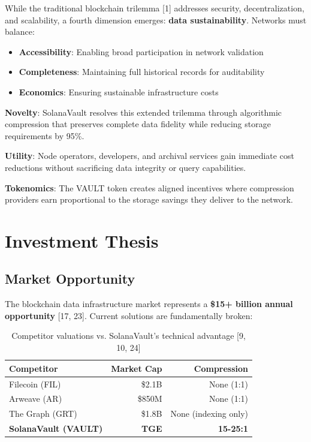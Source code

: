 \documentclass[12pt,a4paper]{article}
\begin{document}
While the traditional blockchain trilemma [1] addresses security, decentralization, and scalability, a fourth dimension emerges: \textbf{data sustainability}. Networks must balance:

\begin{itemize}
    \item \textbf{Accessibility}: Enabling broad participation in network validation
    \item \textbf{Completeness}: Maintaining full historical records for auditability
    \item \textbf{Economics}: Ensuring sustainable infrastructure costs
\end{itemize}

\noindent\textbf{Novelty}: SolanaVault resolves this extended trilemma through algorithmic compression that preserves complete data fidelity while reducing storage requirements by 95\%.

\noindent\textbf{Utility}: Node operators, developers, and archival services gain immediate cost reductions without sacrificing data integrity or query capabilities.

\noindent\textbf{Tokenomics}: The VAULT token creates aligned incentives where compression providers earn proportional to the storage savings they deliver to the network.

\section{Investment Thesis}

\subsection{Market Opportunity}

The blockchain data infrastructure market represents a \textbf{\$15+ billion annual opportunity} [17, 23]. Current solutions are fundamentally broken:

\begin{table}[h]
\centering
\begin{tabular}{@{}lrr@{}}
\toprule
\textbf{Competitor} & \textbf{Market Cap} & \textbf{Compression} \\
\midrule
Filecoin (FIL) & \$2.1B & None (1:1) \\
Arweave (AR) & \$850M & None (1:1) \\
The Graph (GRT) & \$1.8B & None (indexing only) \\
\textbf{SolanaVault (VAULT)} & \textbf{TGE} & \textbf{15-25:1} \\
\bottomrule
\end{tabular}
\caption{Competitor valuations vs. SolanaVault's technical advantage [9, 10, 24]}
\end{table}
\end{document}
